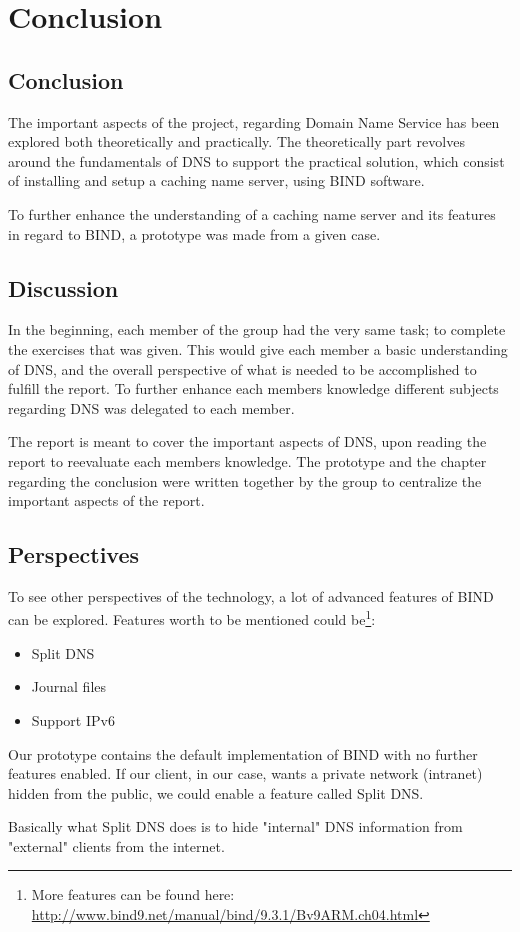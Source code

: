 \chapter{Conclusion}
\section{Conclusion}
The important aspects of the project, regarding Domain Name Service has been explored both theoretically and practically.  The theoretically part revolves around the fundamentals of DNS to support the practical solution, which consist of installing and setup a caching name server, using BIND software.

To further enhance the understanding of a caching name server and its features in regard to BIND, a prototype was made from a given case.

\section{Discussion}

In the beginning, each member of the group had the very same task; to complete the exercises that was given. This would give each member a basic understanding of DNS, and the overall perspective of what is needed to be accomplished to fulfill the report.
To further enhance each members knowledge different subjects regarding DNS was delegated to each member.

The report is meant to cover the important aspects of DNS, upon reading the report to reevaluate each members knowledge. The prototype and the chapter regarding the conclusion were written together by the group to centralize the important aspects of the report.
\section{Perspectives}

To see other perspectives of the technology, a lot of advanced features of BIND can be explored. Features worth to be mentioned could be\footnote{More features can be found here: \url{http://www.bind9.net/manual/bind/9.3.1/Bv9ARM.ch04.html}}:

\begin{itemize}
  \item Split DNS
  \item Journal files
  \item Support IPv6
\end{itemize}

Our prototype contains the default implementation of BIND with no further features enabled. If our client, in our case, wants a private network (intranet) hidden from the public, we could enable a feature called Split DNS.

Basically what Split DNS does is to hide "internal" DNS information from "external" clients from the internet.